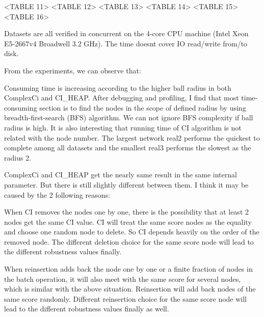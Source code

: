 \documentclass{article}
\begin{document}
	<TABLE 11>
	<TABLE 12>
	<TABLE 13>
	<TABLE 14>
	<TABLE 15>
	<TABLE 16>
	
	Datasets are all verified in concurrent on the 4-core CPU machine (Intel Xeon E5-2667v4 Broadwell 3.2 GHz). The time doesn\textquotesingle t cover IO read/write from/to disk. 
	
	
	From the experiments, we can observe that:
	
	\begin{enumerate}
		\begin{item}
			Consuming time is increasing according to the higher ball radius in both ComplexCi and CI\_HEAP. After debugging and profiling, I find that most time-consuming section is to find the nodes in the scope of defined radius by using breadth-first-search (BFS) algorithm. We can not ignore BFS complexity if ball radius is high. It is also interesting that running time of CI algorithm is not related with the node number. The largest network real2 performs the quickest to complete among all datasets and the smallest real3 performs the slowest as the radius 2.
		\end{item}
		\begin{item}
			ComplexCi and CI\_HEAP get the nearly same result in the same internal parameter. But there is still slightly different between them. I think it may be caused by the 2 following reasons:
			
			\begin{enumerate}
			\begin{item}
				
				When CI removes the nodes one by one, there is the possibility that at least 2 nodes get the same CI value. CI will treat the same score nodes as the equality and choose one random node to delete. So CI depends heavily on the order of the removed node. The different deletion choice for the same score node will lead to the different robustness values finally. 	
				
			\end{item}
			\begin{item}
	
				When reinsertion adds back the node one by one or a finite fraction of nodes in the batch operation, it will also meet with the same score for several nodes, which is similar with the above situation. Reinsertion will add back nodes of the same score randomly. Different reinsertion choice for the same score node will lead to the different robustness values finally as well.
			\end{item}		
		

\end{enumerate}
\end{item}
\end{enumerate}
\end{document}
